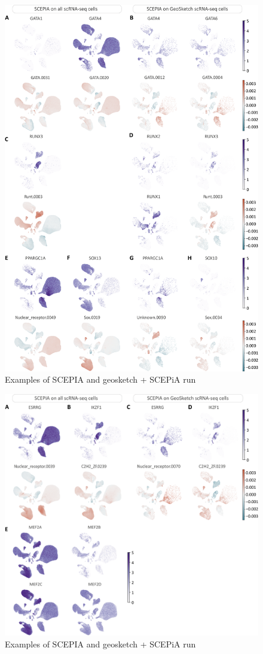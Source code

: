 \begin{figure}
    \centering
    \includegraphics[width=\linewidth]{ch.scepia/imgs/SCEPIA_SCEPIAGEO_BiologicalExamples_SuppFig1_v2.png}
    \caption{Examples of SCEPIA and geosketch + SCEPiA run}
    \label{fig:scepia_features1}
\end{figure}

\begin{figure}
    \centering
    \includegraphics[width=\linewidth]{ch.scepia/imgs/SCEPIA_SCEPIAGEO_BiologicalExamples_SuppFig2_v2.png}
    \caption{Examples of SCEPIA and geosketch + SCEPiA run}
    \label{fig:scepia_features2}
\end{figure}